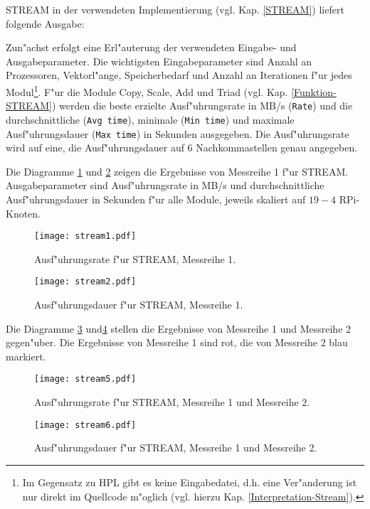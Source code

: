 STREAM in der verwendeten Implementierung (vgl. Kap. \ref{STREAM}) liefert folgende Ausgabe:

Zun"achst erfolgt eine Erl"auterung der verwendeten Eingabe- und Ausgabeparameter. Die wichtigsten Eingabeparameter sind Anzahl an Prozessoren, Vektorl"ange, Speicherbedarf und Anzahl an Iterationen f"ur jedes Modul\footnote{Im Gegensatz zu HPL gibt es keine Eingabedatei, d.h. eine Ver"anderung ist nur direkt im Quellcode m"oglich (vgl. hierzu Kap. \ref{Interpretation-Stream}).}. F"ur die Module Copy, Scale, Add und Triad (vgl. Kap. \ref{Funktion-STREAM}) werden die beste erzielte Ausf"uhrungsrate in MB/s (\texttt{Rate}) und die durchschnittliche (\texttt{Avg time}), minimale (\texttt{Min time}) und maximale Ausf"uhrungsdauer (\texttt{Max time}) in Sekunden ausgegeben. Die Ausf"uhrungsrate wird auf eine, die Ausf"uhrungsdauer auf 6 Nachkommastellen genau angegeben. 

Die Diagramme \ref{fig:stream1} und \ref{fig:stream2} zeigen die Ergebnisse von Messreihe 1 f"ur STREAM. Ausgabeparameter sind Ausf"uhrungsrate in MB/s und durchschnittliche Ausf"uhrungsdauer in Sekunden f"ur alle Module, jeweils skaliert auf $19-4$ RPi-Knoten. 
\begin{figure}[htb]
  \centering
  \texttt{[image: stream1.pdf]}\\ 
  \caption{Ausf"uhrungsrate f"ur STREAM, Messreihe 1.}
  \label{fig:stream1}		
\end{figure}
\begin{figure}[htb]
  \centering
  \texttt{[image: stream2.pdf]}\\ 
  \caption{Ausf"uhrungsdauer f"ur STREAM, Messreihe 1.}
  \label{fig:stream2}		
\end{figure}

\noindent
Die Diagramme \ref{fig:stream5} und\ref{fig:stream6} stellen die Ergebnisse von Messreihe 1 und Messreihe 2 gegen"uber. Die Ergebnisse von Messreihe 1 sind rot, die von Messreihe 2 blau markiert. 
\begin{figure}[htb]
  \centering
  \texttt{[image: stream5.pdf]}\\ 
  \caption{Ausf"uhrungsrate f"ur STREAM, Messreihe 1 und Messreihe 2.}\label{fig:stream5}
\end{figure}
\begin{figure}[htb]
  \centering
  \texttt{[image: stream6.pdf]}\\ 
  \caption{Ausf"uhrungsdauer f"ur STREAM, Messreihe 1 und Messreihe 2.}\label{fig:stream6}
\end{figure}

